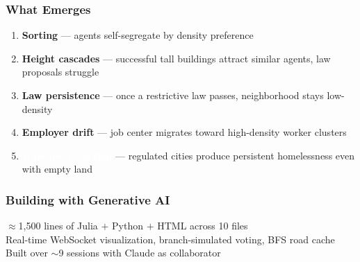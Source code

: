 \documentclass{beamer}
\begin{document}
\begin{frame}
  \frametitle{What Emerges}
  \begin{enumerate}
    \item \textcolor{nimbygreen}{\textbf{Sorting}} — agents self-segregate by density preference
    \item \textcolor{nimbyyellow}{\textbf{Height cascades}} — successful tall buildings attract similar agents, law proposals struggle
    \item \textcolor{nimbyred}{\textbf{Law persistence}} — once a restrictive law passes, neighborhood stays low-density
    \item \textcolor{nimbyblue}{\textbf{Employer drift}} — job center migrates toward high-density worker clusters
    \item \textcolor{white}{\textbf{Unhoused fraction}} — regulated cities produce persistent homelessness even with empty land
  \end{enumerate}
\end{frame}


\begin{frame}
  \frametitle{Building with Generative AI}
  \begin{center}
    \textcolor{nimbygray}{$\approx$1,500 lines of Julia $+$ Python $+$ HTML across 10 files}\\[0.5em]
    \textcolor{nimbygray}{Real-time WebSocket visualization, branch-simulated voting, BFS road cache}\\[1em]
    \textcolor{nimbyyellow}{\large Built over $\sim$9 sessions with Claude as collaborator}
  \end{center}
\end{frame}
\end{document}
